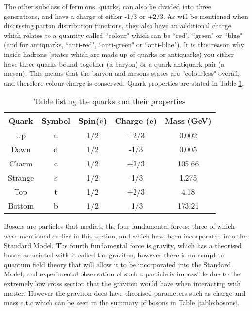 \documentclass[11pt,oneside,a4paper]{article}
\begin{document}
The other subclass of fermions, quarks, can also be divided into three generations, and have a charge of either -1/3 or +2/3. As will be mentioned when discussing parton distribution functions, they also have an additional charge which relates to a quantity called ``colour" which can be ``red", ``green" or ``blue" (and for antiquarks, ``anti-red", ``anti-green" or ``anti-blue"). It is this reason why inside hadrons (states which are made up of quarks or antiquarks) you either have three quarks bound together (a baryon) or a quark-antiquark pair (a meson). This means that the baryon and mesons states are ``colourless" overall, and therefore colour charge is conserved. Quark properties are stated in Table \ref{table:quarks}.

\begin{table}[h!]
\begin{center}
	\begin{tabular}{|| c | c| c |c |c||} 
		\hline
		Quark & Symbol & Spin($\hbar$) & Charge (e) &  Mass (GeV) \\ [0.5ex] 
		\hline\hline
		 Up & u & 1/2 & +2/3 & 0.002  \\ 
		Down & d & 1/2  & -1/3 & 0.005 \\
		\hline
		Charm & c & 1/2 & +2/3 & 105.66 \\
		Strange & s & 1/2 & -1/3 & 1.275\\
		\hline
		Top & t & 1/2 & +2/3 & 4.18 \\ 
		Bottom & b & 1/2 & -1/3 & 173.21 \\ [1 ex] 
		\hline
	\end{tabular}
\caption{Table listing the quarks and their properties}
\label{table:quarks}
\end{center}
\end{table}

Bosons are particles that mediate the four fundamental forces; three of which were mentioned earlier in this section, and which have been incorporated into the Standard Model. The fourth fundamental force is gravity, which has a theorised boson associated with it called the graviton, however there is no complete quantum field theory that will allow it to be incorporated into the Standard Model, and experimental observation of such a particle is impossible due to the extremely low cross section that the graviton would have when interacting with matter.
However the graviton does have theorised parameters such as charge and mass e.t.c which can be seen in the summary of bosons in Table \ref{table:bosons}.
\end{document}
